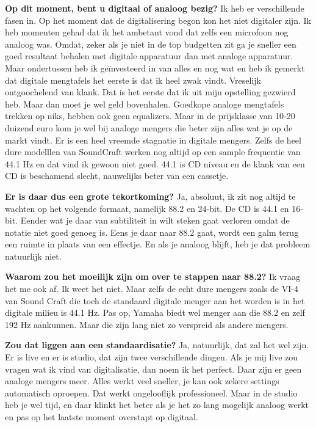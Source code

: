 \textbf{Op dit moment, bent u digitaal of analoog bezig?}\newline
Ik heb er verschillende fasen in. Op het moment dat de digitalisering begon kon het niet digitaler zijn.
Ik heb momenten gehad dat ik het ambetant vond dat zelfs een microfoon nog analoog was.
Omdat, zeker als je niet in de top budgetten zit ga je sneller een goed resultaat behalen met digitale apparatuur dan met analoge apparatuur.
Maar ondertussen heb ik geïnvesteerd in van alles en nog wat en heb ik gemerkt dat digitale mengtafels het eerste is dat ik heel zwak vindt.
Vreselijk ontgoochelend van klank. Dat is het eerste dat ik uit mijn opstelling gezwierd heb. Maar dan moet je wel geld bovenhalen.
Goedkope analoge mengtafels trekken op niks, hebben ook geen equalizers. Maar in de prijsklasse van 10-20 duizend euro kom je wel bij analoge mengers die beter zijn alles wat je op de markt vindt.
Er is een heel vreemde stagnatie in digitale mengers. Zelfs de heel dure modelllen van SoundCraft werken nog altijd op een sample frequentie van 44.1 Hz en dat vind ik gewoon niet goed.
44.1 is CD niveau en de klank van een CD is beschamend slecht, nauwelijks beter van een cassetje.

\textbf{Er is daar dus een grote tekortkoming?}\newline
Ja, absoluut, ik zit nog altijd te wachten op het volgende formaat, namelijk 88.2 en 24-bit. De CD is 44.1 en 16-bit. Eender wat je daar van subtiliteit in wilt steken gaat verloren omdat de notatie niet goed genoeg is.
Eens je daar naar 88.2 gaat, wordt een galm terug een ruimte in plaats van een effectje. En als je analoog blijft, heb je dat probleem natuurlijk niet.

\textbf{Waarom zou het moeilijk zijn om over te stappen naar 88.2?}\newline
Ik vraag het me ook af. Ik weet het niet. Maar zelfs de echt dure mengers zoals de VI-4 van Sound Craft die toch de standaard digitale menger aan het worden is in het digitale milieu is 44.1 Hz.
Pas op, Yamaha biedt wel menger aan die 88.2 en zelf 192 Hz aankunnen. Maar die zijn lang niet zo verspreid als andere mengers.

\textbf{Zou dat liggen aan een standaardisatie?}\newline
Ja, natuurlijk, dat zal het wel zijn. Er is live en er is studio, dat zijn twee verschillende dingen. Als je mij live zou vragen wat ik vind van digitalisatie, dan noem ik het perfect.
Daar zijn er geen analoge mengers meer. Alles werkt veel sneller, je kan ook zekere settings automatisch oproepen. Dat werkt ongelooflijk professioneel.
Maar in de studio heb je wel tijd, en daar klinkt het beter als je het zo lang mogelijk analoog werkt en pas op het laatste moment overstapt op digitaal.

